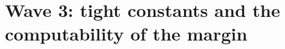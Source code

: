 %
%
%
\section{Wave 3: tight constants and the computability of the margin}\label{sec:wave3}

\providecommand{\TV}{\mathrm{TV}}
\providecommand{\KL}{\mathrm{KL}}
\providecommand{\sgn}{\operatorname{sign}}
\providecommand{\Nrm}{\mathcal N}

